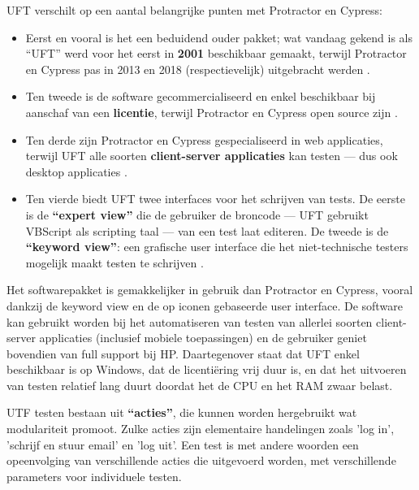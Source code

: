 UFT verschilt op een aantal belangrijke punten met Protractor en Cypress:
\begin{itemize}
    \item Eerst en vooral is het een beduidend ouder pakket; wat vandaag gekend is als ``UFT'' werd voor het eerst in \textbf{2001} beschikbaar gemaakt, terwijl Protractor en Cypress pas in 2013 en 2018 (respectievelijk) uitgebracht werden \autocite{Swati2020,Mann2018,Amorim2014}.
    
    \item Ten tweede is de software gecommercialiseerd en enkel beschikbaar bij aanschaf van een \textbf{licentie}, terwijl Protractor en Cypress open source zijn \autocite{Guru99SeleniumUFTDifference,VSoftUFTvsSelenium,Mann2017,Kumar}.

    \item Ten derde zijn Protractor en Cypress gespecialiseerd in web applicaties, terwijl UFT alle soorten \textbf{client-server applicaties} kan testen — dus ook desktop applicaties \autocite{Tribbiani2017,Cypress1,Amorim2014}.

    \item Ten vierde biedt UFT twee interfaces voor het schrijven van tests. De eerste is de \textbf{``expert view''} die de gebruiker de broncode — UFT gebruikt VBScript als scripting taal \autocite{Rajkumar2017} — van een test laat editeren. De tweede is de \textbf{``keyword view''}: een grafische user interface die het niet-technische testers mogelijk maakt testen te schrijven \autocite{Guru99WhatIsQTPUFT}.
\end{itemize}

Het softwarepakket is gemakkelijker in gebruik dan Protractor en Cypress, vooral dankzij de keyword view en de op iconen gebaseerde user interface. De software kan gebruikt worden bij het automatiseren van testen van allerlei soorten client-server applicaties (inclusief mobiele toepassingen) en de gebruiker geniet bovendien van full support bij HP. Daartegenover staat dat UFT enkel beschikbaar is op Windows, dat de licentiëring vrij duur is, en dat het uitvoeren van testen relatief lang duurt doordat het de CPU en het RAM zwaar belast. \autocite{TutorialspointQTPQuickGuide,Arvy2011,Guru99SeleniumUFTDifference,Michaeli2016}

UTF testen bestaan uit \textbf{``acties''}, die kunnen worden hergebruikt wat modulariteit promoot. Zulke acties zijn elementaire handelingen zoals 'log in', 'schrijf en stuur email' en 'log uit'. Een test is met andere woorden een opeenvolging van verschillende acties die uitgevoerd worden, met verschillende parameters voor individuele testen. \autocite{TutorialspointQTPQuickGuide,Guru99ActionsInQTPUFT}

